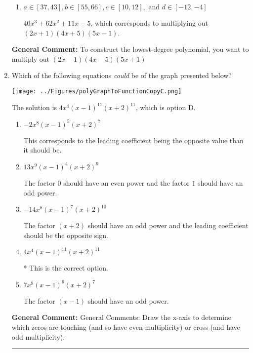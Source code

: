 \documentclass{extbook}[14pt]
\newcommand{\litem}[1]{\item #1

\rule{\textwidth}{0.4pt}}
\begin{document}
\begin{enumerate}
{\begin{enumerate}[label=\Alph*.]
$40x^{3} +78 x^{2} +39 x + 5$, which corresponds to multiplying out $(2x + 1)(4x + 5)(5x + 1)$.
\item \( a \in [37, 43], b \in [55, 66], c \in [10, 12], \text{ and } d \in [-12, -4] \)

$40x^{3} +62 x^{2} +11 x -5$, which corresponds to multiplying out $(2x + 1)(4x + 5)(5x -1)$.
\end{enumerate}

\textbf{General Comment:} To construct the lowest-degree polynomial, you want to multiply out $(2x -1)(4x -5)(5x + 1)$
}
\litem{
Which of the following equations \textit{could} be of the graph presented below?

\begin{center}
    \texttt{[image: ../Figures/polyGraphToFunctionCopyC.png]}
\end{center}


The solution is \( 4x^{4} (x - 1)^{11} (x + 2)^{11} \), which is option D.\begin{enumerate}[label=\Alph*.]
\item \( -2x^{8} (x - 1)^{5} (x + 2)^{7} \)

This corresponds to the leading coefficient being the opposite value than it should be.
\item \( 13x^{9} (x - 1)^{4} (x + 2)^{9} \)

The factor $0$ should have an even power and the factor $1$ should have an odd power.
\item \( -14x^{8} (x - 1)^{7} (x + 2)^{10} \)

The factor $(x + 2)$ should have an odd power and the leading coefficient should be the opposite sign.
\item \( 4x^{4} (x - 1)^{11} (x + 2)^{11} \)

* This is the correct option.
\item \( 7x^{8} (x - 1)^{6} (x + 2)^{7} \)

The factor $(x - 1)$ should have an odd power.
\end{enumerate}

\textbf{General Comment:} General Comments: Draw the x-axis to determine which zeros are touching (and so have even multiplicity) or cross (and have odd multiplicity).
}
\end{enumerate}
\end{document}
